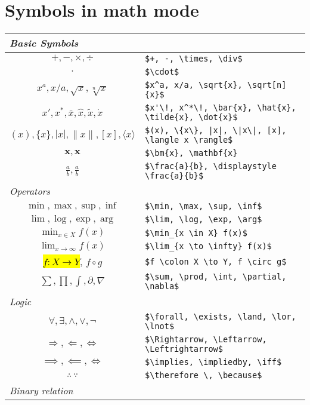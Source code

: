 \documentclass[a4paper]{article}
\begin{document}
\section*{Symbols in math mode}
\noindent \begin{tabular}{|c|l|} \hline
    \multicolumn{2}{|l|}{\textit{Basic Symbols}} \\ \hline
    $+, -, \times, \div$ & \verb|$+, -, \times, \div$|\\
    $\cdot$ & \verb|$\cdot$|\\
    $x^a, x/a, \sqrt{x}, \sqrt[n]{x}$ & \verb|$x^a, x/a, \sqrt{x}, \sqrt[n]{x}$|\\
    $x'\!, x^*\!, \bar{x}, \hat{x}, \tilde{x}, \dot{x}$ & \verb|$x'\!, x^*\!, \bar{x}, \hat{x}, \tilde{x}, \dot{x}$|\\
    $(x), \{x\}, |x|, \|x\|, [x], \langle x \rangle$ & \verb+$(x), \{x\}, |x|, \|x\|, [x], \langle x \rangle$+\\
    $\bm{x}, \mathbf{x}$ & \verb|$\bm{x}, \mathbf{x}|\\
    $\frac{a}{b}, \displaystyle \frac{a}{b}$ & \verb|$\frac{a}{b}, \displaystyle \frac{a}{b}$|\\ \hline
    \multicolumn{2}{|l|}{\textit{Operators}} \\ \hline
    $\min, \max, \sup, \inf$ & \verb|$\min, \max, \sup, \inf$|\\
    $\lim, \log, \exp, \arg$ & \verb|$\lim, \log, \exp, \arg$|\\
    $\min_{x \in X} f(x)$ & \verb|$\min_{x \in X} f(x)$|\\
    $\lim_{x \to \infty} f(x)$ & \verb|$\lim_{x \to \infty} f(x)$|\\
    \hl{$f \colon X \to Y$}\footnotemark, $f \circ g$ & \verb|$f \colon X \to Y, f \circ g$|\\
    $\sum, \prod, \int, \partial, \nabla$ & \verb|$\sum, \prod, \int, \partial, \nabla$|\\ \hline
    \multicolumn{2}{|l|}{\textit{Logic}} \\ \hline
    $\forall, \exists, \land, \lor, \lnot$ & \verb|$\forall, \exists, \land, \lor, \lnot$|\\
    $\Rightarrow, \Leftarrow, \Leftrightarrow$ & \verb|$\Rightarrow, \Leftarrow, \Leftrightarrow$|\\
    $\implies, \impliedby, \iff$ & \verb|$\implies, \impliedby, \iff$|\\
    $\therefore \, \because$ & \verb|$\therefore \, \because$|\\ \hline
    \multicolumn{2}{|l|}{\textit{Binary relation}} \\ \hline

\end{tabular}
\end{document}
